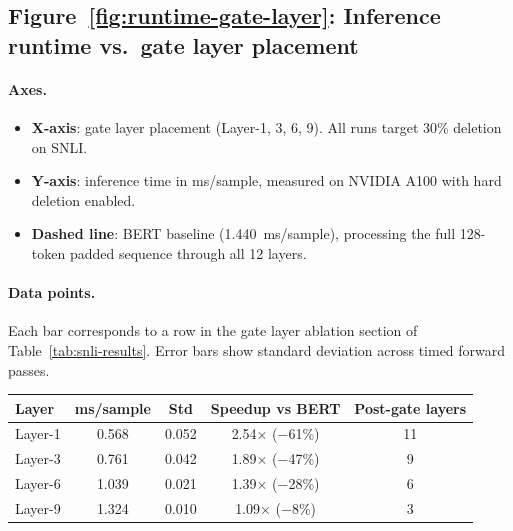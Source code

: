 \documentclass{article} %
\begin{document}
\subsection{Figure~\ref{fig:runtime-gate-layer}: Inference runtime vs.\ gate layer placement}

\paragraph{Axes.}
\begin{itemize}[nosep]
    \item \textbf{X-axis}: gate layer placement (Layer-1, 3, 6, 9). All runs target 30\% deletion on SNLI.
    \item \textbf{Y-axis}: inference time in ms/sample, measured on NVIDIA A100 with hard deletion enabled.
    \item \textbf{Dashed line}: BERT baseline (1.440~ms/sample), processing the full 128-token padded sequence through all 12 layers.
\end{itemize}

\paragraph{Data points.}
Each bar corresponds to a row in the gate layer ablation section of Table~\ref{tab:snli-results}. Error bars show standard deviation across timed forward passes.

\begin{center}\small
\begin{tabular}{@{}lcccc@{}}
\toprule
\textbf{Layer} & \textbf{ms/sample} & \textbf{Std} & \textbf{Speedup vs BERT} & \textbf{Post-gate layers} \\
\midrule
Layer-1  & 0.568 & 0.052 & 2.54$\times$ ($-$61\%) & 11 \\
Layer-3  & 0.761 & 0.042 & 1.89$\times$ ($-$47\%) & 9 \\
Layer-6  & 1.039 & 0.021 & 1.39$\times$ ($-$28\%) & 6 \\
Layer-9  & 1.324 & 0.010 & 1.09$\times$ ($-$8\%)  & 3 \\
\bottomrule
\end{tabular}
\end{center}
\end{document}
